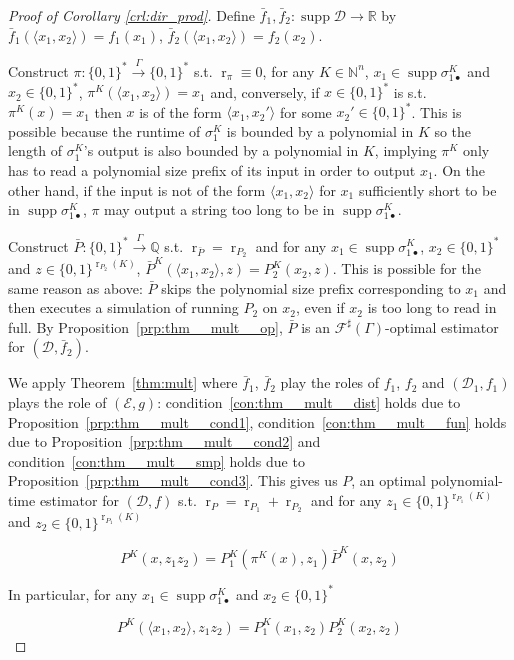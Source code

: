\documentclass{article}
\numberwithin{equation}{section}
\theoremstyle{definition}
\theoremstyle{plain}
\newcommand{\Bool}{\{0,1\}}
\newcommand{\Words}{{\Bool^*}}
\DeclareMathOperator{\Supp}{supp}
\DeclareMathOperator{\R}{r}
\newcommand{\Nats}{\mathbb{N}}
\newcommand{\Rats}{\mathbb{Q}}
\newcommand{\Reals}{\mathbb{R}}
\newcommand{\Chev}[1]{\langle #1 \rangle}
\newcommand{\Dist}{\mathcal{D}}
\newcommand{\Fall}{\mathcal{F}}
\newcommand{\ESG}{\Fall^\sharp(\Gamma)}
\newcommand{\Scheme}{\xrightarrow{\Gamma}}
\begin{document}
\begin{proof}[Proof of Corollary \ref{crl:dir_prod}]

Define $\bar{f}_1, \bar{f}_2: \Supp \Dist \rightarrow \Reals$ by $\bar{f}_1(\Chev{x_1,x_2})=f_1(x_1)$, $\bar{f}_2(\Chev{x_1,x_2})=f_2(x_2)$. 

Construct $\pi: \Words \Scheme \Words$ s.t. $\R_\pi \equiv 0$, for any $K \in \Nats^n$, ${x_1 \in \Supp \sigma_{1\bullet}^{K}}$ and ${x_2 \in \Words}$, ${\pi^{K}(\Chev{x_1,x_2})=x_1}$ and, conversely, if ${x \in \Words}$ is s.t. ${\pi^K(x)=x_1}$ then ${x}$ is of the form ${\Chev{x_1,x_2'}}$ for some ${x_2' \in \Words}$. This is possible because the runtime of $\sigma_1^K$ is bounded by a polynomial in $K$ so the length of $\sigma_{1}^K$'s output is also bounded by a polynomial in $K$, implying $\pi^K$ only has to read a polynomial size prefix of its input in order to output $x_1$. On the other hand, if the input is not of the form ${\Chev{x_1,x_2}}$ for ${x_1}$ sufficiently short to be in ${\Supp \sigma_{1\bullet}^{K}}$, ${\pi}$ may output a string too long to be in ${\Supp \sigma_{1\bullet}^{K}}$.

Construct $\bar{P}: \Words \Scheme \Rats$ s.t. $\R_{\bar{P}}=\R_{P_2}$ and for any $x_1 \in \Supp \sigma_{1\bullet}^K$, $x_2 \in \Words$ and $z \in \Bool^{\R_{P_2}(K)}$, $\bar{P}^K(\Chev{x_1,x_2},z)=P_2^K(x_2,z)$. This is possible for the same reason as above: $\bar{P}$ skips the polynomial size prefix corresponding to $x_1$ and then executes a simulation of running $P_2$ on $x_2$, even if $x_2$ is too long to read in full. By Proposition~\ref{prp:thm__mult__op}, $\bar{P}$ is an $\ESG$-optimal estimator for $(\Dist,\bar{f}_2)$. 

We apply Theorem~\ref{thm:mult} where $\bar{f}_1$, $\bar{f}_2$ play the roles of $f_1$, $f_2$ and $(\Dist_1, f_1)$ plays the role of $(\mathcal{E},g)$: condition~\ref{con:thm__mult__dist} holds due to Proposition~\ref{prp:thm__mult__cond1}, condition~\ref{con:thm__mult__fun} holds due to Proposition~\ref{prp:thm__mult__cond2} and condition~\ref{con:thm__mult__smp} holds due to Proposition~\ref{prp:thm__mult__cond3}. This gives us $P$, an optimal polynomial-time estimator for $(\Dist, f)$ s.t. ${\R_P=\R_{P_1}+\R_{P_2}}$ and for any ${z_1 \in \Bool^{\R_{P_1}(K)}}$ and $z_2 \in \Bool^{\R_{P_1}(K)}$ 

\[P^K(x, z_1 z_2) = P_1^K(\pi^K(x),z_1) \bar{P}^K(x,z_2)\]

In particular, for any ${x_1 \in \Supp \sigma_{1\bullet}^K}$ and $x_2 \in \Words$

\[P^K(\Chev{x_1,x_2}, z_1 z_2)=P_1^K(x_1,z_2)P_2^K(x_2,z_2)\]
%
\end{proof}
\end{document}
